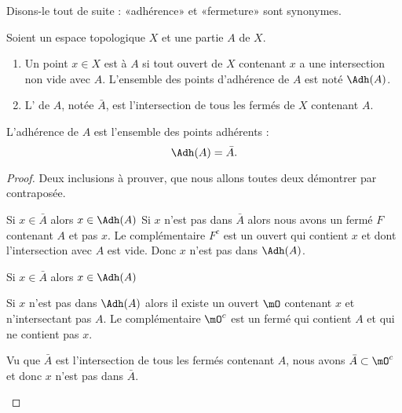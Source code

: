 Disons-le tout de suite : «adhérence» et «fermeture» sont synonymes.

\begin{definition}      \label{DEFooSVWMooLpAVZR}
    Soient un espace topologique \( X\) et une partie \( A\) de \( X\).
    \begin{enumerate}
        \item
            Un point \( x\in X\) est  à \( A\) si tout ouvert de \( X\) contenant \( x\) a une intersection non vide avec \( A\). L'ensemble des points d'adhérence de \( A\) est noté $\Adh(A)$.
        \item
            L' de \( A\), notée \( \bar A\), est l'intersection de tous les fermés de \( X\) contenant \( A\).
    \end{enumerate}
\end{definition}

\begin{lemma}       \label{LEMooILNCooOFZaTe}
    L'adhérence de \( A\) est l'ensemble des points adhérents :
    \begin{equation}
        \Adh(A)=\bar A.
    \end{equation}
\end{lemma}

\begin{proof}
    Deux inclusions à prouver, que nous allons toutes deux démontrer par contraposée.
    \begin{subproof}
        \item[Si \( x\in \bar A\) alors \( x\in\Adh(A)\)]
            Si \( x\) n'est pas dans \( \bar A\) alors nous avons un fermé \( F\) contenant \( A\) et pas \( x\). Le complémentaire \( F^c\) est un ouvert qui contient \( x\) et dont l'intersection avec \( A\) est vide. Donc \( x\) n'est pas dans \( \Adh(A)\).

        \item[Si \( x\in\bar A\) alors \( x\in \Adh(A)\)]

            Si \( x\) n'est pas dans \( \Adh(A)\) alors il existe un ouvert \( \mO\) contenant \( x\) et n'intersectant pas \( A\). Le complémentaire \( \mO^c\) est un fermé qui contient \( A\) et qui ne contient pas \( x\).

            Vu que \( \bar A\) est l'intersection de tous les fermés contenant \( A\), nous avons \( \bar A\subset\mO^c\) et donc \( x\) n'est pas dans \( \bar A\).
    \end{subproof}
\end{proof}

